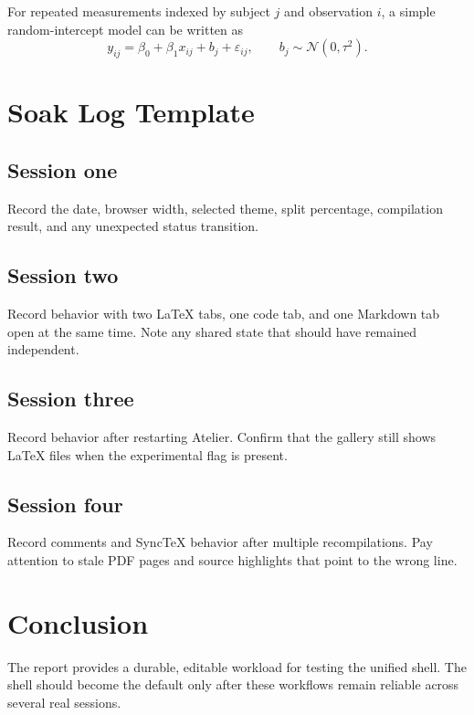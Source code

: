 \documentclass[12pt]{report}
\begin{document}
For repeated measurements indexed by subject $j$ and observation $i$, a simple
random-intercept model can be written as
\begin{equation}
  y_{ij} = \beta_0 + \beta_1 x_{ij} + b_j + \varepsilon_{ij},
  \qquad b_j \sim \mathcal{N}(0,\tau^2).
\end{equation}

\chapter{Soak Log Template}
\section{Session one}
Record the date, browser width, selected theme, split percentage, compilation
result, and any unexpected status transition.

\section{Session two}
Record behavior with two LaTeX tabs, one code tab, and one Markdown tab open at
the same time. Note any shared state that should have remained independent.

\section{Session three}
Record behavior after restarting Atelier. Confirm that the gallery still shows
LaTeX files when the experimental flag is present.

\section{Session four}
Record comments and SyncTeX behavior after multiple recompilations. Pay attention
to stale PDF pages and source highlights that point to the wrong line.

\chapter{Conclusion}
The report provides a durable, editable workload for testing the unified shell.
The shell should become the default only after these workflows remain reliable
across several real sessions.

\appendix
\end{document}
